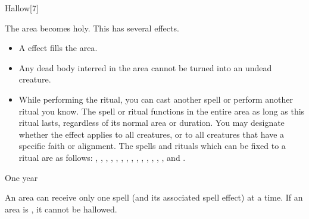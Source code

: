 \begin{spellsection}{Hallow}[7]
    \begin{spellheader}
    \end{spellheader}
    \begin{spellcontent}
        \begin{spelltargetinginfo}
        \end{spelltargetinginfo}
        \begin{spelleffects}

            \spellline
            \spelleffect The area becomes holy. This has several effects.
            \begin{itemize}
                \item A  effect fills the area.
                \item Any dead body interred in the area cannot be turned into an undead creature.
                \item While performing the ritual, you can cast another spell or perform another ritual you know. The spell or ritual functions in the entire area as long as this ritual lasts, regardless of its normal area or duration. You may designate whether the effect applies to all creatures, or to all creatures that have a specific faith or alignment. The spells and rituals which can be fixed to a  ritual are as follows: , , , , , , , , , , , , , , and .
            \end{itemize}
            \spelldur One year
        \end{spelleffects}
    \end{spellcontent}
    \begin{spellfooter}
        \spellnotes An area can receive only one  spell (and its associated spell effect) at a time. If an area is , it cannot be hallowed.
    \end{spellfooter}
\end{spellsection}

